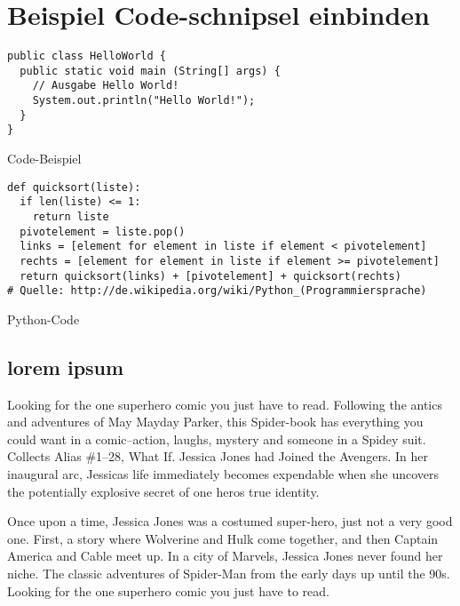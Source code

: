 
\chapter{Beispiel Code-schnipsel einbinden}


\begin{listing}
\begin{verbatim}
public class HelloWorld {
  public static void main (String[] args) {
    // Ausgabe Hello World!
    System.out.println("Hello World!");
  }
}
\end{verbatim}
\caption{Code-Beispiel}
\label{Bsp.1}
\end{listing}

\begin{listing}
\begin{verbatim}
def quicksort(liste):
  if len(liste) <= 1:
    return liste
  pivotelement = liste.pop()
  links = [element for element in liste if element < pivotelement]
  rechts = [element for element in liste if element >= pivotelement]
  return quicksort(links) + [pivotelement] + quicksort(rechts)
# Quelle: http://de.wikipedia.org/wiki/Python_(Programmiersprache)
\end{verbatim}
\caption{Python-Code}
\label{Python-Code}
\end{listing}

\section{lorem ipsum}
Looking for the one superhero comic you just have to read. Following the antics and adventures of May Mayday Parker, this Spider-book has everything you could want in a comic--action, laughs, mystery and someone in a Spidey suit. Collects Alias \#1--28, What If. Jessica Jones had Joined the Avengers. In her inaugural arc, Jessicas life immediately becomes expendable when she uncovers the potentially explosive secret of one heros true identity. 

Once upon a time, Jessica Jones was a costumed super-hero, just not a very good one. First, a story where Wolverine and Hulk come together, and then Captain America and Cable meet up. In a city of Marvels, Jessica Jones never found her niche. The classic adventures of Spider-Man from the early days up until the 90s. Looking for the one superhero comic you just have to read.

